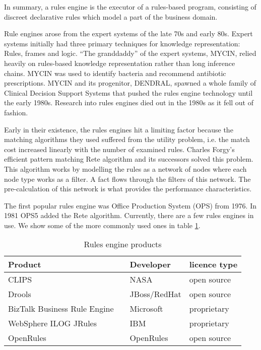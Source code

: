 In summary, a rules engine is the executor of a rules-based program, consisting of discreet declarative rules which model a part of the business domain.


Rule engines arose from the expert systems of the late 70s and early 80s.
Expert systems initially had three primary techniques for knowledge representation: Rules, frames and logic\cite{jackson1986introduction}.
``The granddaddy'' of the expert systems, MYCIN, relied heavily on rules-based knowledge representation\cite{shortliffe1974mycin} rather than long inference chains.
MYCIN was used to identify bacteria and recommend antibiotic prescriptions.
MYCIN and its progenitor, DENDRAL, spawned a whole family of Clinical Decision Support Systems that pushed the rules engine technology until the early 1980s.
Research into rules engines died out in the 1980s as it fell out of fashion.

Early in their existence, the rules engines hit a limiting factor because the matching algorithms they used suffered from the utility problem, i.e. the match cost increased linearly with the number of examined rules.
Charles Forgy's efficient pattern matching Rete algorithm\cite{forgy1989rete} and its successors solved this problem.
This algorithm works by modelling the rules as a network of nodes where each node type works as a filter.
A fact flows through the filters of this network.
The pre-calculation of this network is what provides the performance characteristics.

The first popular rules engine was Office Production System (OPS) from 1976.
In 1981 OPS5 added the Rete algorithm.
Currently, there are a few rules engines in use.
We show some of the more commonly used ones in table \ref{table:RuleEngines}.

\begin{table}
    \begin{center}
        \begin{tabular}{ |l c |l|l| } 
            \hline
            Product                      &                             & Developer    & licence type   \\
            \hline
            CLIPS                        &\cite{CLIPSProductPage}      & NASA         & open source    \\ 
            Drools                       &\cite{DroolsProductPage}     & JBoss/RedHat & open source    \\ 
            BizTalk Business Rule Engine &\cite{BiztalkProductPage}    & Microsoft    & proprietary    \\ 
            WebSphere ILOG JRules        &\cite{JRulesProductPage}     & IBM          & proprietary    \\ 
            OpenRules                    &\cite{OpenRulesProductPage}  & OpenRules    & open source    \\ 
            \hline
        \end{tabular}
    \end{center}
    \caption{Rules engine products}
    \label{table:RuleEngines}
\end{table}



